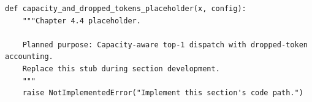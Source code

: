 \begin{lstlisting}[style=bookpython,caption={Planned code placeholder for capacity and dropped tokens.},label={lst:ch04-capacity-and-dropped-tokens}]
def capacity_and_dropped_tokens_placeholder(x, config):
    """Chapter 4.4 placeholder.

    Planned purpose: Capacity-aware top-1 dispatch with dropped-token accounting.
    Replace this stub during section development.
    """
    raise NotImplementedError("Implement this section's code path.")
\end{lstlisting}
